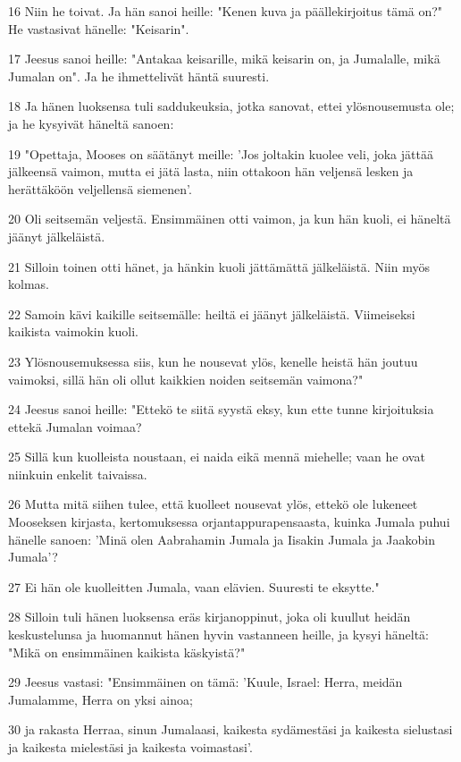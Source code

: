 \par 16 Niin he toivat. Ja hän sanoi heille: "Kenen kuva ja päällekirjoitus tämä on?" He vastasivat hänelle: "Keisarin".
\par 17 Jeesus sanoi heille: "Antakaa keisarille, mikä keisarin on, ja Jumalalle, mikä Jumalan on". Ja he ihmettelivät häntä suuresti.
\par 18 Ja hänen luoksensa tuli saddukeuksia, jotka sanovat, ettei ylösnousemusta ole; ja he kysyivät häneltä sanoen:
\par 19 "Opettaja, Mooses on säätänyt meille: 'Jos joltakin kuolee veli, joka jättää jälkeensä vaimon, mutta ei jätä lasta, niin ottakoon hän veljensä lesken ja herättäköön veljellensä siemenen'.
\par 20 Oli seitsemän veljestä. Ensimmäinen otti vaimon, ja kun hän kuoli, ei häneltä jäänyt jälkeläistä.
\par 21 Silloin toinen otti hänet, ja hänkin kuoli jättämättä jälkeläistä. Niin myös kolmas.
\par 22 Samoin kävi kaikille seitsemälle: heiltä ei jäänyt jälkeläistä. Viimeiseksi kaikista vaimokin kuoli.
\par 23 Ylösnousemuksessa siis, kun he nousevat ylös, kenelle heistä hän joutuu vaimoksi, sillä hän oli ollut kaikkien noiden seitsemän vaimona?"
\par 24 Jeesus sanoi heille: "Ettekö te siitä syystä eksy, kun ette tunne kirjoituksia ettekä Jumalan voimaa?
\par 25 Sillä kun kuolleista noustaan, ei naida eikä mennä miehelle; vaan he ovat niinkuin enkelit taivaissa.
\par 26 Mutta mitä siihen tulee, että kuolleet nousevat ylös, ettekö ole lukeneet Mooseksen kirjasta, kertomuksessa orjantappurapensaasta, kuinka Jumala puhui hänelle sanoen: 'Minä olen Aabrahamin Jumala ja Iisakin Jumala ja Jaakobin Jumala'?
\par 27 Ei hän ole kuolleitten Jumala, vaan elävien. Suuresti te eksytte."
\par 28 Silloin tuli hänen luoksensa eräs kirjanoppinut, joka oli kuullut heidän keskustelunsa ja huomannut hänen hyvin vastanneen heille, ja kysyi häneltä: "Mikä on ensimmäinen kaikista käskyistä?"
\par 29 Jeesus vastasi: "Ensimmäinen on tämä: 'Kuule, Israel: Herra, meidän Jumalamme, Herra on yksi ainoa;
\par 30 ja rakasta Herraa, sinun Jumalaasi, kaikesta sydämestäsi ja kaikesta sielustasi ja kaikesta mielestäsi ja kaikesta voimastasi'.
